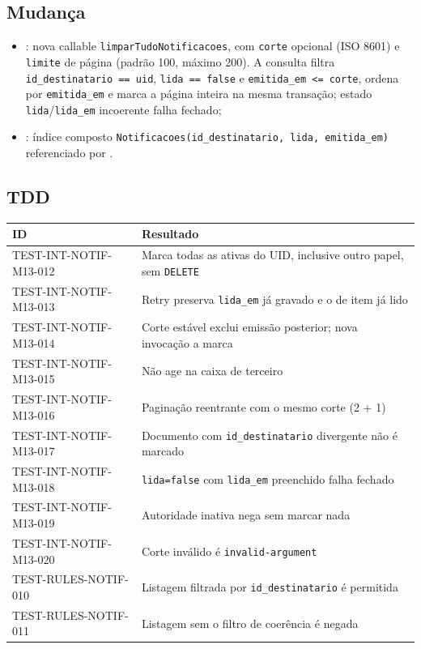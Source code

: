 \subsection{Mudança}

\begin{itemize}
  \item {}: nova callable
  \texttt{limparTudoNotificacoes}, com \texttt{corte} opcional (ISO 8601) e
  \texttt{limite} de página (padrão 100, máximo 200). A consulta filtra
  \texttt{id\_destinatario == uid}, \texttt{lida == false} e
  \texttt{emitida\_em <= corte}, ordena por \texttt{emitida\_em} e marca a
  página inteira na mesma transação; estado \texttt{lida}/\texttt{lida\_em}
  incoerente falha fechado;
  \item {}: índice composto
  \texttt{Notificacoes(id\_destinatario, lida, emitida\_em)} referenciado por
  .
\end{itemize}

\subsection{TDD}

\small
\begin{longtable}{@{}p{}p{}@{}}
\toprule
ID & Resultado \\
\midrule
\endhead
TEST-INT-NOTIF-M13-012 & Marca todas as ativas do UID, inclusive outro papel, sem \texttt{DELETE} \\
TEST-INT-NOTIF-M13-013 & Retry preserva \texttt{lida\_em} já gravado e o de item já lido \\
TEST-INT-NOTIF-M13-014 & Corte estável exclui emissão posterior; nova invocação a marca \\
TEST-INT-NOTIF-M13-015 & Não age na caixa de terceiro \\
TEST-INT-NOTIF-M13-016 & Paginação reentrante com o mesmo corte (2 + 1) \\
TEST-INT-NOTIF-M13-017 & Documento com \texttt{id\_destinatario} divergente não é marcado \\
TEST-INT-NOTIF-M13-018 & \texttt{lida=false} com \texttt{lida\_em} preenchido falha fechado \\
TEST-INT-NOTIF-M13-019 & Autoridade inativa nega sem marcar nada \\
TEST-INT-NOTIF-M13-020 & Corte inválido é \texttt{invalid-argument} \\
TEST-RULES-NOTIF-010 & Listagem filtrada por \texttt{id\_destinatario} é permitida \\
TEST-RULES-NOTIF-011 & Listagem sem o filtro de coerência é negada \\
\bottomrule
\end{longtable}
\normalsize

